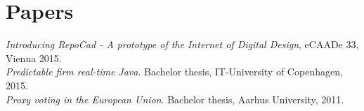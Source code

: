 \documentclass[12pt,a4paper,notitlepage]{article}
\begin{document}
\section*{Papers}
\textit{Introducing RepoCad  - A prototype of the Internet of Digital Design}, eCAADe 33, Vienna 2015. \\
\textit{Predictable firm real-time Java}. Bachelor thesis, IT-University of Copenhagen, 2015. \\
\textit{Proxy voting in the European Union}. Bachelor thesis, Aarhus University, 2011.
\end{document}
